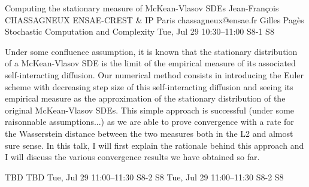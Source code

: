\begin{talk}
  {Computing the stationary measure of McKean-Vlasov SDEs}%
  {Jean-Fran\c{c}ois CHASSAGNEUX}%
  {ENSAE-CREST \& IP Paris}%
  {chassagneux@ensae.fr}%
  {Gilles Pag\`es}%
  {Stochastic Computation and Complexity}%
  {Tue, Jul 29 10:30–11:00}%
  {S8-1}%
  {S8}%
				
			
Under some confluence assumption, it is known that the stationary distribution of a McKean-Vlasov SDE is the limit of the empirical measure of its associated self-interacting diffusion. 
Our numerical method consists in introducing the Euler scheme with decreasing step size of this self-interacting diffusion and seeing its empirical measure as the approximation of the stationary distribution of the original McKean-Vlasov SDEs.
This simple approach is successful (under some raisonnable assumptions...) as we are able to prove convergence with a rate for the Wasserstein distance between the two measures both in the L2 and almost sure sense. In this talk, I will first explain the rationale behind this approach and  I will discuss the various convergence results we have obtained so far.





\end{talk}

\begin{talk}
  {TBD}%
  {TBD}%
  {Tue, Jul 29 11:00–11:30}%
  {S8-2}%
  {S8}%
  {}%
  {Tue, Jul 29 11:00–11:30}%
  {S8-2}%
  {S8}%
\end{talk}

